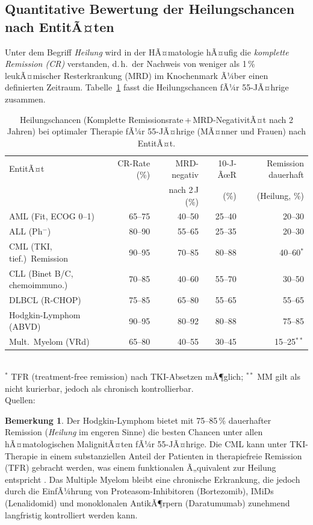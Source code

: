 ﻿\documentclass[12pt,a4paper]{article}
\theoremstyle{definition}
\newtheorem{remark}[theorem]{Bemerkung}
\begin{document}
\subsection{Quantitative Bewertung der Heilungschancen nach EntitÃ¤ten}

Unter dem Begriff \emph{Heilung} wird in der HÃ¤matologie hÃ¤ufig die
\emph{komplette Remission (CR)} verstanden, d.\,h.\ der Nachweis von weniger als
1\,\% leukÃ¤mischer Resterkrankung (MRD) im Knochenmark Ã¼ber einen definierten
Zeitraum. Tabelle~\ref{tab:heilung} fasst die Heilungschancen fÃ¼r 55-JÃ¤hrige
zusammen.

\begin{table}
\centering
\caption{Heilungschancen (Komplette Remissionsrate\,+\,MRD-NegativitÃ¤t nach
2 Jahren) bei optimaler Therapie fÃ¼r 55-JÃ¤hrige (MÃ¤nner und Frauen) nach EntitÃ¤t.}
\label{tab:heilung}
\begin{tabular}{@{}lrrrr@{}}
\toprule
EntitÃ¤t & CR-Rate (\%) & MRD-negativ & 10-J-ÃœR & Remission dauerhaft \\
        &             & nach 2\,J (\%) & (\%) & (Heilung, \%) \\
\midrule
AML (Fit, ECOG 0--1)        & 65--75 & 40--50 & 25--40 & 20--30 \\
ALL (Ph$^{-}$)              & 80--90 & 55--65 & 25--35 & 20--30 \\
CML (TKI, tief.)\ Remission & 90--95 & 70--85 & 80--88 & 40--60$^*$ \\
CLL (Binet B/C, chemoimmuno.)& 70--85 & 40--60 & 55--70 & 30--50 \\
DLBCL (R-CHOP)              & 75--85 & 65--80 & 55--65 & 55--65 \\
Hodgkin-Lymphom (ABVD)      & 90--95 & 80--92 & 80--88 & 75--85 \\
Mult.\ Myelom (VRd)         & 65--80 & 40--55 & 30--45 & 15--25$^{**}$ \\
\bottomrule
\end{tabular}
\smallskip\\
\footnotesize $^*$ TFR (treatment-free remission) nach TKI-Absetzen mÃ¶glich;
$^{**}$ MM gilt als nicht kurierbar, jedoch als chronisch kontrollierbar.\\
Quellen: \cite{dohner2017,kantarjian2021,hochhaus2017,zenz2014,coiffier2002,palumbo2011,burnett2007}
\end{table}

\begin{remark}
  Der Hodgkin-Lymphom bietet mit 75--85\,\% dauerhafter Remission (\emph{Heilung}
  im engeren Sinne) die besten Chancen unter allen hÃ¤matologischen MalignitÃ¤ten
  fÃ¼r 55-JÃ¤hrige. Die CML kann unter TKI-Therapie in einem substanziellen Anteil
  der Patienten in therapiefreie Remission (TFR) gebracht werden, was einem
  funktionalen Ã„quivalent zur Heilung entspricht \cite{hochhaus2017}.
  Das Multiple Myelom bleibt eine chronische Erkrankung, die jedoch durch
  die EinfÃ¼hrung von Proteasom-Inhibitoren (Bortezomib), IMiDs (Lenalidomid)
  und monoklonalen AntikÃ¶rpern (Daratumumab) zunehmend langfristig kontrolliert
  werden kann.
\end{remark}
\end{document}
